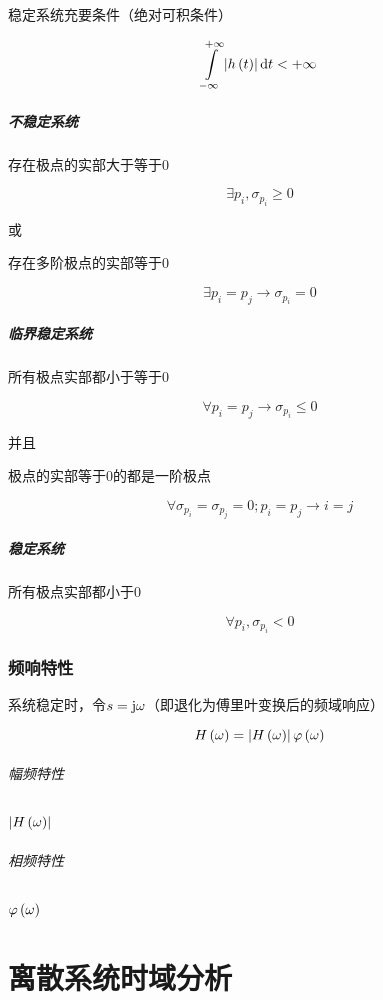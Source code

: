\documentclass{article}
\begin{document}
稳定系统充要条件（绝对可积条件）

\[\impint\abs{h\p{t}}\d t<+\infty\]

\subsubsection{不稳定系统}

存在极点的实部大于等于0

\[\exists p_i,\sigma_{p_i}\geqslant0\]

或

存在多阶极点的实部等于0

\[\exists p_i=p_j\to\sigma_{p_i}=0\]

\subsubsection{临界稳定系统}

所有极点实部都小于等于0

\[\forall p_i=p_j\to\sigma_{p_i}\leqslant0\]

并且

极点的实部等于0的都是一阶极点

\[\forall\sigma_{p_i}=\sigma_{p_j}=0;p_i=p_j\to i=j\]

\subsubsection{稳定系统}

所有极点实部都小于0

\[\forall p_i,\sigma_{p_i}<0\]

\section{频响特性}

系统稳定时，令$s=\mathrm j\omega$（即退化为傅里叶变换后的频域响应）

\[H\left(\omega\right)=\left|H\left(\omega\right)\right|\varphi\left(\omega\right)\]

\paragraph{幅频特性}$\left|H\left(\omega\right)\right|$

\paragraph{相频特性}$\varphi\left(\omega\right)$

\part{离散系统时域分析}
\end{document}
